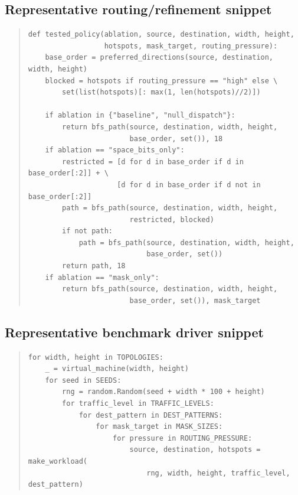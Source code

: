 \documentclass[11pt]{article}
\begin{document}
\subsection{Representative routing/refinement snippet}
\begin{quote}
\begin{verbatim}
def tested_policy(ablation, source, destination, width, height,
                  hotspots, mask_target, routing_pressure):
    base_order = preferred_directions(source, destination, width, height)
    blocked = hotspots if routing_pressure == "high" else \
        set(list(hotspots)[: max(1, len(hotspots)//2)])

    if ablation in {"baseline", "null_dispatch"}:
        return bfs_path(source, destination, width, height,
                        base_order, set()), 18
    if ablation == "space_bits_only":
        restricted = [d for d in base_order if d in base_order[:2]] + \
                     [d for d in base_order if d not in base_order[:2]]
        path = bfs_path(source, destination, width, height,
                        restricted, blocked)
        if not path:
            path = bfs_path(source, destination, width, height,
                            base_order, set())
        return path, 18
    if ablation == "mask_only":
        return bfs_path(source, destination, width, height,
                        base_order, set()), mask_target
\end{verbatim}
\end{quote}

\subsection{Representative benchmark driver snippet}
\begin{quote}
\begin{verbatim}
for width, height in TOPOLOGIES:
    _ = virtual_machine(width, height)
    for seed in SEEDS:
        rng = random.Random(seed + width * 100 + height)
        for traffic_level in TRAFFIC_LEVELS:
            for dest_pattern in DEST_PATTERNS:
                for mask_target in MASK_SIZES:
                    for pressure in ROUTING_PRESSURE:
                        source, destination, hotspots = make_workload(
                            rng, width, height, traffic_level, dest_pattern)
\end{verbatim}
\end{quote}
\end{document}
